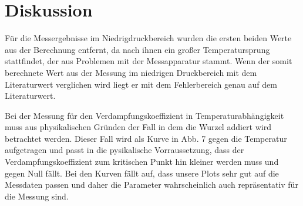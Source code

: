 \section{Diskussion}
\label{sec:Diskussion}
Für die Messergebnisse im Niedrigdruckbereich wurden die ersten beiden Werte aus der Berechnung entfernt, da nach ihnen ein großer Temperatursprung stattfindet, der aus Problemen mit der Messapparatur stammt.
Wenn der somit berechnete Wert aus der Messung im niedrigen Druckbereich mit dem Literaturwert verglichen wird liegt er mit dem Fehlerbereich genau auf dem Literaturwert.

Bei der Messung für den Verdampfungskoeffizient in Temperaturabhängigkeit muss aus physikalischen Gründen der Fall in dem die Wurzel addiert wird betrachtet werden.
Dieser Fall wird als Kurve in Abb. 7 gegen die Temperatur aufgetragen und passt in die pysikalische Vorraussetzung, dass der Verdampfungskoeffizient zum kritischen Punkt hin kleiner werden muss und gegen Null fällt.
Bei den Kurven fällt auf, dass unsere Plots sehr gut auf die Messdaten passen und daher die Parameter wahrscheinlich auch repräsentativ für die Messung sind.